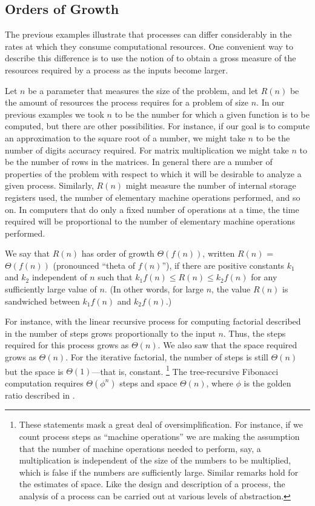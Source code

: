\subsection{Orders of Growth}
\label{Section 1.2.3}

The previous examples illustrate that processes can differ considerably in the rates at which they consume computational resources.
One convenient way to describe this difference is to use the notion of  to obtain a gross measure of the resources required by a process as the inputs become larger.

Let \( n \) be a parameter that measures the size of the problem, and let \( R(n) \) be the amount of resources the process requires for a problem of size \( n \).
In our previous examples we took \( n \) to be the number for which a given function is to be computed, but there are other possibilities.
For instance, if our goal is to compute an approximation to the square root of a number, we might take \( n \) to be the number of digits accuracy required.
For matrix multiplication we might take \( n \) to be the number of rows in the matrices.
In general there are a number of properties of the problem with respect to which it will be desirable to analyze a given process.
Similarly, \( R(n) \) might measure the number of internal storage registers used, the number of elementary machine operations performed, and so on.
In computers that do only a fixed number of operations at a time, the time required will be proportional to the number of elementary machine operations performed.

We say that \( R(n) \) has order of growth \( Θ(f(n)) \), written \( R(n) \) = \( Θ(f(n)) \) (pronounced “theta of \( f(n) \)”), if there are positive constants \( k_1 \) and \( k_2 \) independent of \( n \) such that \( k_1 f(n) ≤ R(n) ≤ k_2 f(n) \) for any sufficiently large value of \( n \).
(In other words, for large \( n \), the value \( R(n) \) is sandwiched between \( k_1 f(n) \) and \( k_2 f(n) \).)

For instance, with the linear recursive process for computing factorial described in  the number of steps grows proportionally to the input \( n \).
Thus, the steps required for this process grows as \( Θ(n) \).
We also saw that the space required grows as \( Θ(n) \).
For the iterative factorial, the number of steps is still \( Θ(n) \) but the space is \( Θ(1) \)---that is, constant.%
\footnote{
	These statements mask a great deal of oversimplification.
	For instance, if we count process steps as “machine operations” we are making the assumption that the number of machine operations needed to perform, say, a multiplication is independent of the size of the numbers to be multiplied, which is false if the numbers are sufficiently large.
	Similar remarks hold for the estimates of space.
	Like the design and description of a process, the analysis of a process can be carried out at various levels of abstraction.
}
The tree-recursive Fibonacci computation requires \( Θ(ϕ^n) \) steps and space \( Θ(n) \), where \( ϕ \) is the golden ratio described in .

